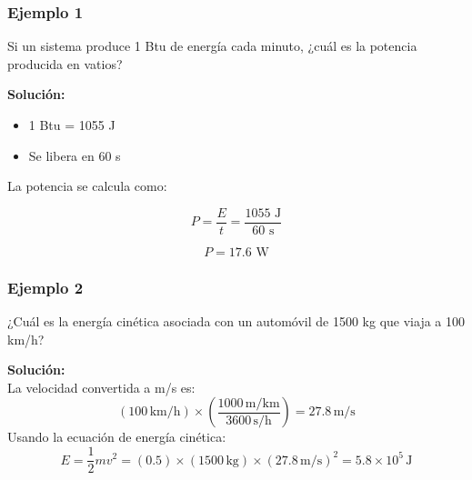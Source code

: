 \documentclass[main.tex]{subfiles}
\begin{document}
\begin{frame}[t] %
    \frametitle{Ejemplo 1}
    
    Si un sistema produce 1 Btu de energía cada minuto, ¿cuál es la potencia producida en vatios?

    \pause %

    \textbf{Solución:}  
    \begin{itemize}
        \item 1 Btu = 1055 J
        \item Se libera en 60 s
    \end{itemize}

    La potencia se calcula como:

    \[
    P = \frac{E}{t} = \frac{1055 \text{ J}}{60 \text{ s}}
    \]

    \[
    P = 17.6 \text{ W}
    \]

\end{frame}
\begin{frame}[t] %
    \frametitle{Ejemplo 2}
    ¿Cuál es la energía cinética asociada con un automóvil de 1500 kg que viaja a 100 km/h?

    \pause %

    \textbf{Solución:} \\
    La velocidad convertida a m/s es: \\
    \[
    (100 \, \text{km/h}) \times \left(\frac{1000 \, \text{m/km}}{3600 \, \text{s/h}}\right) = 27.8 \, \text{m/s}
    \]
    Usando la ecuación de energía cinética: \\
    \[
    E = \frac{1}{2} m v^2 = (0.5) \times (1500 \, \text{kg}) \times (27.8 \, \text{m/s})^2 = 5.8 \times 10^5 \, \text{J}
    \]
\end{frame}
\end{document}
